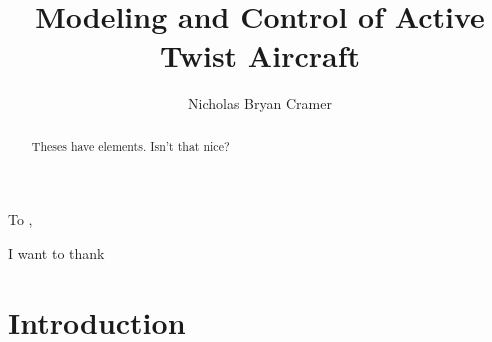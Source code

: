 \documentclass[11pt]{ucthesis}
\begin{document}

\title{Modeling and Control of Active Twist Aircraft}
\author{Nicholas Bryan Cramer}
\deanlinethree{}

\begin{frontmatter}

\maketitle
\copyrightpage

\tableofcontents
\listoffigures
\listoftables

\begin{abstract}
Theses have elements.  Isn't that nice?

\end{abstract}

\begin{dedication}
\null\vfil
{\large
\begin{center}
To ,\\\vspace{12pt}

\end{center}}
\vfil\null
\end{dedication}


\begin{acknowledgements}
I want to thank
\end{acknowledgements}

\end{frontmatter}

\chapter{Introduction}
\end{document}

